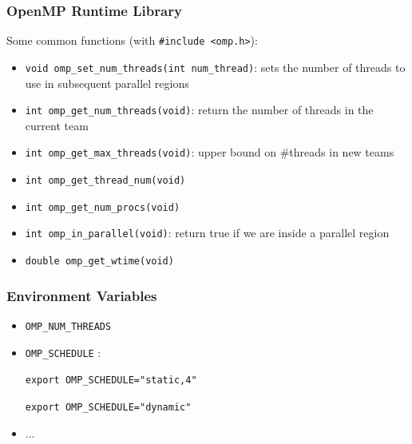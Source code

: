 \documentclass{beamer}
\begin{document}
\begin{frame}[fragile=singleslide]
  \frametitle{OpenMP Runtime Library}

Some common functions (with \texttt{#include <omp.h>}):
\begin{itemize}
  \item \texttt{void omp_set_num_threads(int num_thread)}: sets the number
    of threads to use in subsequent parallel regions
    
  \item \texttt{int omp_get_num_threads(void)}: return the number of threads in the current team
  \item \texttt{int omp_get_max_threads(void)}: upper bound on \#threads in new teams
  \item \texttt{int omp_get_thread_num(void)}
  \item \texttt{int omp_get_num_procs(void)}
  \item \texttt{int omp_in_parallel(void)}: return true if we are inside a parallel region
  \item \texttt{double omp_get_wtime(void)}
\end{itemize}

  
\end{frame}


\begin{frame}
  \frametitle{Environment Variables}
  \begin{itemize}
  \item {\tt OMP\_NUM\_THREADS}
  \item {\tt OMP\_SCHEDULE} :

{\tt export OMP\_SCHEDULE="static,4"}

{\tt export OMP\_SCHEDULE="dynamic"}

    
      
      

  \item ...    
  \end{itemize}
\end{frame}
\end{document}
